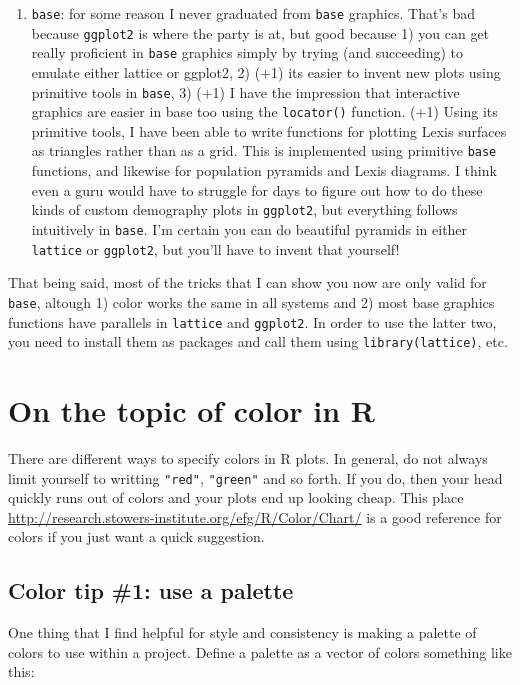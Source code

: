 \documentclass[a4paper]{article}
\begin{document}
\begin{enumerate}
\item{\texttt{base}}: for some reason I never graduated from \texttt{base} graphics. That's bad because \texttt{ggplot2} is where the party is at, but good because 1) you can get really proficient in \texttt{base} graphics simply by trying (and succeeding) to emulate either lattice or ggplot2, 2) (+1) its easier to invent new plots using primitive tools in \texttt{base}, 3) (+1) I have the impression that interactive graphics are easier in base too using the \texttt{locator()} function. (+1) Using its primitive tools, I have been able to write functions for plotting Lexis surfaces as triangles rather than as a grid. This is implemented using primitive \texttt{base} functions, and likewise for population pyramids and Lexis diagrams. I think even a guru would have to struggle for days to figure out how to do these kinds of custom demography plots in \texttt{ggplot2}, but everything follows intuitively in \texttt{base}. I'm certain you can do beautiful pyramids in either \texttt{lattice} or \texttt{ggplot2}, but you'll have to invent that yourself!
\end{enumerate}

That being said, most of the tricks that I can show you now are only valid for \texttt{base}, altough 1) color works the same in all systems and 2) most base graphics functions have parallels in \texttt{lattice} and \texttt{ggplot2}. In order to use the latter two, you need to install them as packages and call them using \texttt{library(lattice)}, etc.
\section{On the topic of color in R}
There are different ways to specify colors in R plots. In general, do not always limit yourself to writting \texttt{"red"}, \texttt{"green"} and so forth. If you do, then your head quickly runs out of colors and your plots end up looking cheap. This place \url{http://research.stowers-institute.org/efg/R/Color/Chart/} is a good reference for colors if you just want a quick suggestion. 

\subsection{Color tip \#1: use a palette}
One thing that I find helpful for style and consistency is making a palette of colors to use within a project. Define a palette as a vector of colors something like this:
\end{document}
